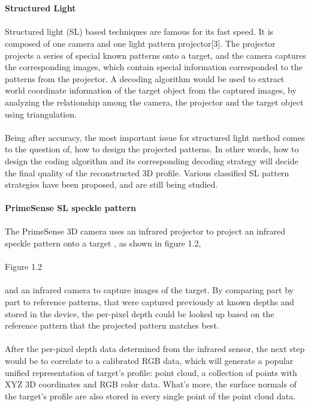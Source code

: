 \\
\\\textbf{Structured Light}\\\\
Structured light (SL) based techniques are famous for its fast speed. It is composed of one camera and one light pattern projector[3]. %
The projector projects a series of special known patterns onto a target, and the camera captures the corresponding images, which contain special information corresponded to the patterns from the projector. A decoding algorithm would be used to extract world coordinate information of the target object from the captured images, by analyzing the relationship among the camera, the projector and the target object using triangulation.\\
\\
Being after accuracy, the most important issue for structured light method comes to the question of, how to design the projected patterns. In other words, how to design the coding algorithm and its corresponding decoding strategy will decide the final quality of the reconstructed 3D profile. Various classified SL pattern strategies have been proposed, and are still being studied.
\\
\\\textbf{PrimeSense SL speckle pattern}\\\\
The PrimeSense 3D camera uses an infrared projector to project an infrared speckle pattern onto a target 
, as shown in figure 1.2,%
\\\\Figure 1.2\\\\
and an infrared camera to capture images of the target. By comparing part by part to reference patterns, that were captured previously at known depths and stored in the device, the per-pixel depth could be looked up based on the reference pattern that the projected pattern matches best. 
\\\\
After the per-pixel depth data determined from the infrared sensor, the next step would be to correlate to a calibrated RGB data, which will generate a popular unified representation of target's profile: point cloud, a collection of points with XYZ 3D coordinates and RGB color data. What's more, the surface normals of the target's profile are also stored in every single point of the point cloud data. 
